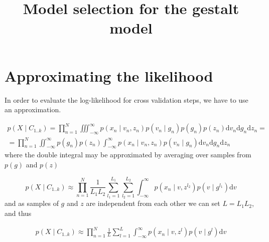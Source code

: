 \documentclass{paper}
\begin{document}
\title{Model selection for the gestalt model}
\maketitle

\section{Approximating the likelihood}

In order to evaluate the log-likelihood for cross validation steps, we have to use an approximation.

\begin{equation}
\begin{split}
p(X \mid C_{1..k}) = \prod_{n=1}^N \iiint_{-\infty}^{\infty} p(x_n \mid v_n,z_n) p(v_n \mid g_n) p(g_n) p(z_n) \mathrm{d}v_n\mathrm{d}g_n\mathrm{d}z_n = \\
= \prod_{n=1}^N \iint_{-\infty}^{\infty}  p(g_n) p(z_n) \int_{-\infty}^{\infty} p(x_n \mid v_n,z_n) p(v_n \mid g_n) \mathrm{d}v_n\mathrm{d}g_n \mathrm{d}z_n
\end{split}
\end{equation}
%
where the double integral may be approximated by averaging over samples from $p(g)$ and $p(z)$

\begin{equation}
p(X \mid C_{1..k}) \approx \prod_{n=1}^N \frac{1}{L_1 L_2} \sum_{l_1=1}^{L_1} \sum_{l_2=1}^{L_2}  \int_{-\infty}^{\infty} p(x_n \mid v,z^{l_2}) p(v \mid g^{l_1}) \mathrm{d}v
\end{equation}
% 
and as samples of $g$ and $z$ are independent from each other we can set $L=L_1L_2$, and thus

\begin{equation}
\begin{split}
p(X \mid C_{1..k}) \approx \prod_{n=1}^N \frac{1}{L} \sum_{l=1}^L \int_{-\infty}^{\infty} p(x_n \mid v,z^l) p(v \mid g^l) \mathrm{d}v
\end{split}
\end{equation}
\end{document}

